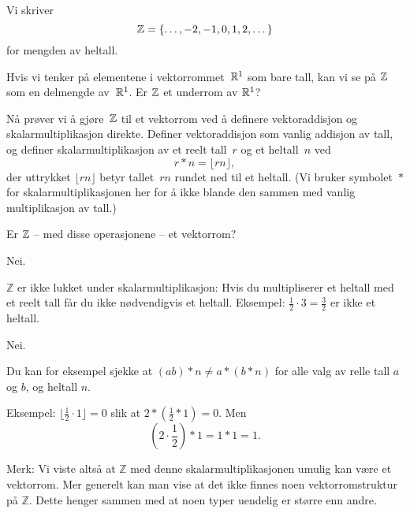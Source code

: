 \begin{oppgave}
Vi skriver
\[
\mathbb{Z}=\{\dots,-2,-1,0,1,2,\dots\}
\]
for mengden av heltall.

\begin{punkt}
Hvis vi tenker på elementene i vektorrommet~$\mathbb{R}^1$ som bare tall,
kan vi se på $\mathbb{Z}$ som en delmengde av~$\mathbb{R}^1$.
Er $\mathbb{Z}$ et underrom av $\mathbb{R}^1$?
\end{punkt}

\begin{punkt}
Nå prøver vi å gjøre~$\mathbb{Z}$ til et vektorrom ved å definere
vektoraddisjon og skalarmultiplikasjon direkte.  Definer
vektoraddisjon som vanlig addisjon av tall, og definer
skalarmultiplikasjon av et reelt tall~$r$ og et heltall~$n$ ved
\[
r \ast n = \lfloor rn \rfloor,
\]
der uttrykket $\lfloor rn \rfloor$ betyr tallet~$rn$ rundet ned til et
heltall.  (Vi bruker symbolet~$\ast$ for skalarmultiplikasjonen her
for å ikke blande den sammen med vanlig multiplikasjon av tall.)


Er $\mathbb{Z}$ -- med disse operasjonene -- et vektorrom?
\end{punkt}

\end{oppgave}


\begin{losning}

\begin{punkt}
Nei. 

\noindent
$\mathbb{Z}$ er ikke lukket under skalarmultiplikasjon: Hvis du multipliserer et heltall med et reelt tall får du ikke nødvendigvis et heltall. Eksempel: $\frac{1}{2}\cdot 3=\frac{3}{2}$ er ikke et heltall.
\end{punkt}

\begin{punkt}
Nei.

\noindent
Du kan for eksempel sjekke at $(ab)\ast n \neq a\ast (b\ast n)$ for alle valg av relle tall $a$ og $b$, og heltall $n$. 

\noindent
Eksempel: $\lfloor \frac{1}{2}\cdot 1 \rfloor =0$ slik at $2 \ast(\frac{1}{2}\ast 1)=0$. Men $$(2\cdot \frac{1}{2})\ast 1=1 \ast 1=1.$$


\noindent
Merk: Vi viste altså at $\mathbb{Z}$ med denne skalarmultiplikasjonen umulig kan være et vektorrom. Mer generelt kan man vise at det ikke finnes noen vektorromstruktur på $\mathbb{Z}$. Dette henger sammen med at noen typer uendelig er større enn andre.
\end{punkt}

\end{losning}

